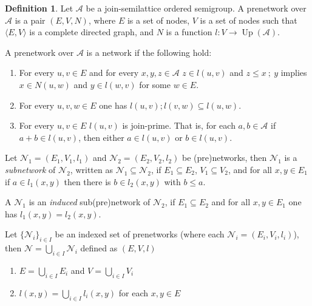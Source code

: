 \documentclass[a4paper]{article}
\theoremstyle{definition}
\newtheorem{definition}{Definition}
\theoremstyle{theorem}
\theoremstyle{proposition}
\theoremstyle{lemma}
\theoremstyle{ex}
\theoremstyle{corollary}
\theoremstyle{claim}
\begin{document}
\begin{definition} Let $\mathcal{A}$ be a join-semilattice ordered semigroup. A prenetwork over $\mathcal{A}$ is a pair $(E, V, N)$, where $E$ is a set of nodes, $V$ is a set of nodes such that $\langle E, V \rangle$ is a complete directed graph, and $N$ is a function $l : V \to \operatorname{Up}(\mathcal{A})$.

  A prenetwork over $\mathcal{A}$ is a network if the following hold:
  \begin{enumerate}
    \item For every $u, v \in E$ and for every $x,y,z \in \mathcal{A}$ $z \in l(u, v)$ and $z \leq x \: ; \: y$ implies $x \in N(u, w)$ and $y \in l(w, v)$ for some $w \in E$.
    \item For every $u, v, w \in E$ one has $l(u, v) ; l(v, w) \subseteq l(u, w)$.
    \item For every $u, v \in E$ $l(u,v)$ is join-prime. That is, for each $a, b \in \mathcal{A}$ if $a + b \in l(u,v)$, then either $a \in l(u,v)$ or $b \in l(u,v)$.
  \end{enumerate}
\end{definition}

Let $\mathcal{N}_1 = (E_1, V_1, l_1)$ and $\mathcal{N}_2 = (E_2, V_2, l_2)$ be (pre)networks, then $\mathcal{N}_1$ is a \emph{subnetwork} of $\mathcal{N}_2$, written as $\mathcal{N}_1 \subseteq \mathcal{N}_2$,
if $E_1 \subseteq E_2$, $V_1 \subseteq V_2$, and for all $x, y \in E_1$ if $a \in l_1(x, y)$ then there is $b \in l_2(x, y)$ with $b \leq a$.

A $\mathcal{N}_1$ is an \emph{induced} sub(pre)network of $\mathcal{N}_2$, if $E_1 \subseteq E_2$ and for all $x, y \in E_1$ one has $l_1(x,y) = l_2(x,y)$.

Let $\{ \mathcal{N}_i \}_{i \in I}$ be an indexed set of prenetworks (where each $\mathcal{N}_i = (E_i, V_i, l_i)$), then $\mathcal{N} = \bigcup \limits_{i \in I} \mathcal{N}_i$ defined as $(E, V, l)$

\begin{enumerate}
  \item $E = \bigcup \limits_{i \in I} E_i$ and $V = \bigcup \limits_{i \in I} V_i$
  \item $l(x, y) = \bigcup \limits_{ i \in I } l_i(x, y)$ for each $x, y \in E$
\end{enumerate}
\end{document}
